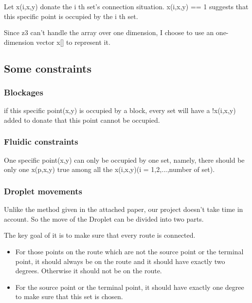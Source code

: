 \documentclass[12pt, a4paper]{article}
\begin{document}
				Let x(i,x,y) donate the i th set's connection situation. x(i,x,y) == 1 suggests that this specific point is occupied by the i th set.

				Since z3 can't handle the array over one dimension, I choose to use an one-dimension vector x[] to represent it.

			\subsection{Some constraints}

				\subsubsection{Blockages}

					if this specific point(x,y) is occupied by a block, every set will have a !x(i,x,y) added to donate that this point cannot be occupied.

				\subsubsection{Fluidic constraints}

					One specific point(x,y) can only be occupied by one set, namely, there should be only one x(p,x,y) true among all the x(i,x,y)(i = 1,2,...,number of set).

				\subsubsection{Droplet movements}

					Unlike the method given in the attached paper, our project doesn't take time in account. So the move of the Droplet can be divided into two parts.

					The key goal of it is to make sure that every route is connected.  

					\begin{itemize}

						\item
							For those points on the route which are not the source point or the terminal point, it should always be on the route and it should have exactly two degrees. Otherwise it should not be on the route.
						\item
							For the source point or the terminal point, it should have exactly one degree to make sure that this set is chosen.

					\end{itemize}
\end{document}
